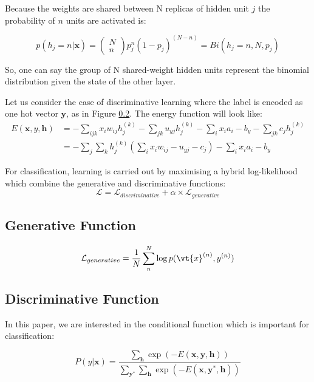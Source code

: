 \documentclass[review]{elsarticle}
\begin{document}
Because the weights are shared between N replicas of hidden unit $j$
the probability of $n$ units are activated is:

\begin{equation}
  p(h_j=n|\mathbf{x}) = \begin{pmatrix}
  N \\
  n  
 \end{pmatrix} p_j^n(1-p_j)^{(N-n)} = Bi(h_j=n,N,p_j)
\end{equation}

So, one can say the group of N shared-weight hidden units represent
the binomial distribution given the state of the other layer.


Let us consider the case of discriminative learning where the label is
encoded as one hot vector $\mathbf{y}$, as in Figure \ref{}. The
energy function will look like:
\begin{equation}
\begin{aligned}
E(\mathbf{x},y,\mathbf{h}) &= -\sum_{ijk}x_iw_{ij}h^{(k)}_j -\sum_{jk}u_{yj}h^{(k)}_j - \sum_i x_i a_i - b_y - \sum_{jk}c_jh^{(k)}_j\\ 
 &= -\sum_{j}\sum_k h^{(k)}_j (\sum_i x_iw_{ij} - u_{yj} - c_j) - \sum_i x_i a_i - b_y
\end{aligned}
\end{equation}

For classification, learning is carried out by maximising a hybrid log-likelihood which combine the generative and discriminative functions:
\begin{equation}
\mathcal{L} = \mathcal{L}_{discriminative} + \alpha\times \mathcal{L}_{generative}
\end{equation}
\subsection{Generative Function}
\begin{equation}
 \mathcal{L}_{generative} = \frac{1}{N}\sum_n^N \log p(\vt{x}^{(n)},y^{(n)})
\end{equation}

\subsection{Discriminative Function}
In this paper, we are interested in the conditional function which is important for classification:

 \begin{equation}
   P(y|\mathbf{x}) = \frac{\sum_{\mathbf{h}} \exp\left(-E\left(\mathbf{x},
     \mathbf{y}, \mathbf{h}\right)\right)}{\sum_{\mathbf{y}^{*}}
     \sum_{\mathbf{h}} \exp\left(-E\left(\mathbf{x}, \mathbf{y}^{*},
     \mathbf{h}\right)\right)} 
   \label{eq:p_y_given_x}
 \end{equation}
\end{document}
